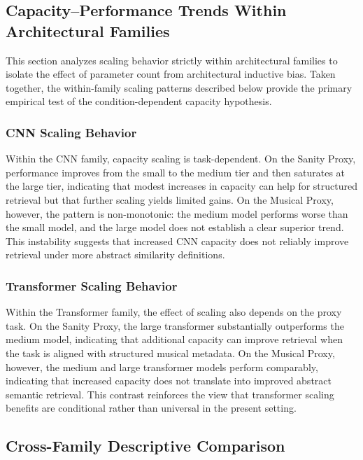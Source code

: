 \documentclass{article}
\begin{document}
\subsection{Capacity--Performance Trends Within Architectural Families}

This section analyzes scaling behavior strictly within architectural families to isolate the effect
of parameter count from architectural inductive bias. Taken together, the within-family scaling
patterns described below provide the primary empirical test of the condition-dependent capacity
hypothesis.

\subsubsection{CNN Scaling Behavior}

Within the CNN family, capacity scaling is task-dependent. On the Sanity Proxy, performance improves
from the small to the medium tier and then saturates at the large tier, indicating that modest
increases in capacity can help for structured retrieval but that further scaling yields limited
gains. On the Musical Proxy, however, the pattern is non-monotonic: the medium model performs worse
than the small model, and the large model does not establish a clear superior trend. This instability
suggests that increased CNN capacity does not reliably improve retrieval under more abstract
similarity definitions.

\subsubsection{Transformer Scaling Behavior}

Within the Transformer family, the effect of scaling also depends on the proxy task. On the Sanity
Proxy, the large transformer substantially outperforms the medium model, indicating that additional
capacity can improve retrieval when the task is aligned with structured musical metadata. On the
Musical Proxy, however, the medium and large transformer models perform comparably, indicating that
increased capacity does not translate into improved abstract semantic retrieval. This contrast
reinforces the view that transformer scaling benefits are conditional rather than universal in the
present setting.

\subsection{Cross-Family Descriptive Comparison}
\end{document}
